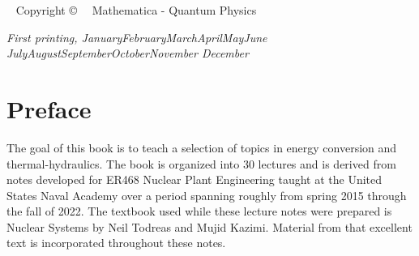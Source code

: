 \documentclass{tufte-book}
\newcommand{\monthyear}{%
  \ifcase\month\or January\or February\or March\or April\or May\or June\or
  July\or August\or September\or October\or November\or
  December\fi\space\number\year
}
\begin{document}
\maketitle


\newpage
\begin{fullwidth}
~\vfill
\thispagestyle{empty}
\setlength{\parindent}{0pt}
\setlength{\parskip}{\baselineskip}
Copyright \copyright\ \the\year\ \thanklessauthor
Mathematica - Quantum Physics
\par{}

%

\par\textit{First printing, \monthyear}
\end{fullwidth}

\tableofcontents

\listoffigures

\listoftables



\cleardoublepage
\chapter*{Preface}

The goal of this book is to teach a selection of topics in energy conversion and thermal-hydraulics.  The book is organized into 30 lectures and is derived from notes developed for ER468 Nuclear Plant Engineering taught at the United States Naval Academy over a period spanning roughly from spring 2015 through the fall of 2022.  The textbook used while these lecture notes were prepared is Nuclear Systems by Neil Todreas and Mujid Kazimi.\cite{todreasNS}  Material from that excellent text is incorporated throughout these notes.
\end{document}
